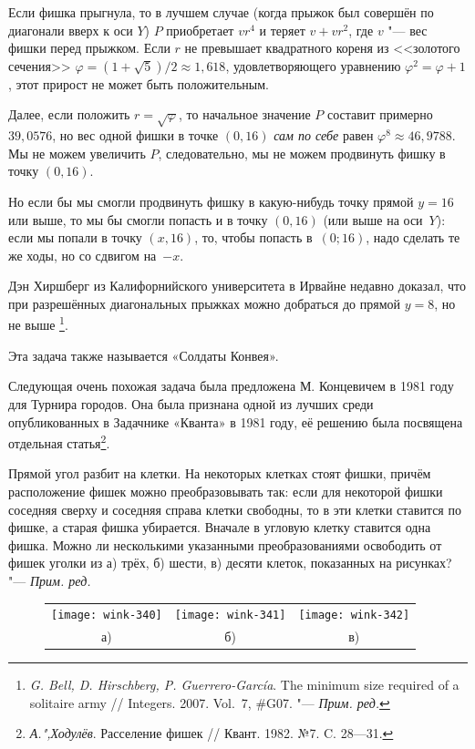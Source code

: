 \documentclass[twoside]{book}
\newenvironment{addedbytheeditors}{\par\medskip\small
}{\par\addvspace{\medskipamount}} %
\begin{document}
Если фишка прыгнула, то в лучшем случае (когда прыжок был совершён по диагонали вверх к оси $Y$) $P$ приобретает $vr^4$ и теряет $v+vr^2$, где $v$ "--- вес фишки перед прыжком.
Если $r$ не превышает квадратного кореня из <<золотого сечения>> $\varphi=(1+\sqrt5)/2\approx 1{,}618$, удовлетворяющего уравнению $\varphi^2=\varphi+1$, этот прирост не может быть положительным.

Далее, если положить $r = \sqrt{\varphi}$, то начальное значение $P$ составит примерно $39{,}0576$, но вес одной фишки в точке $(0, 16)$ \emph{сам по себе} равен $\varphi^8\approx 46{,}9788$.
Мы не можем увеличить $P$, следовательно, мы не можем продвинуть фишку в точку $(0, 16)$.

Но если бы мы смогли продвинуть фишку в какую-нибудь точку прямой $y =
16$ или выше, то мы бы смогли попасть и в точку $(0, 16)$ (или выше на
оси~$Y$): если мы попали в точку $(x, 16)$, то, чтобы попасть
в~$(0;16)$, надо сделать те же ходы, но со сдвигом на~$-x$.
\heart

\medskip
Дэн Хиршберг из Калифорнийского университета в Ирвайне недавно доказал, что при разрешённых диагональных прыжках можно добраться до прямой $y=8$, но не выше%
\footnote{\emph{G. Bell, D. Hirschberg, P. Guerrero-García}.
The minimum size required of a solitaire army  
/\!/ Integers. 2007. Vol.~7, \#G07. %
"--- \emph{Прим. ред.}}.

\begin{addedbytheeditors}
Эта задача также называется «Солдаты Конвея».

Следующая очень похожая задача была предложена М. Концевичем в 1981
году для Турнира городов.
Она была признана одной из лучших среди
опубликованных в Задачнике «Кванта» в 1981 году, её решению была
посвящена отдельная статья\footnote{\emph{А.",Ходулёв}. Расселение фишек /\!/ Квант. 1982. №7. C. 28---31.}.


Прямой угол разбит на клетки.
На некоторых клетках стоят фишки, причём расположение фишек можно преобразовывать так: если для некоторой фишки соседняя сверху и соседняя справа клетки свободны, то в эти клетки ставится по фишке, а старая фишка убирается.
Вначале в угловую клетку ставится одна фишка.
Можно ли несколькими указанными преобразованиями освободить от фишек уголки из 
а) трёх, 
б) шести, 
в) десяти клеток,
показанных на рисунках?
"--- \emph{Прим. ред.}  

\begin{figure}[!ht]
\centering
\begin{tabular}{c@{\qquad}c@{\qquad}c}
\texttt{[image: wink-340]} & %
\texttt{[image: wink-341]} & %
\texttt{[image: wink-342]} \\ %
а) &  б) &  в) 
\end{tabular} 

\vspace{-3\jot}
\end{figure}
\end{addedbytheeditors}
\end{document}
